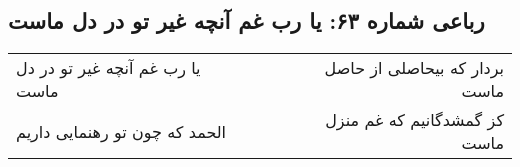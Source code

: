 \begin{center}
\section*{رباعی شماره ۶۳: یا رب غم آنچه غیر تو در دل ماست}
\label{sec:sh063}
\begin{longtable}{l p{0.5cm} r}
یا رب غم آنچه غیر تو در دل ماست
&&
بردار که بیحاصلی از حاصل ماست
\\
الحمد که چون تو رهنمایی داریم
&&
کز گمشدگانیم که غم منزل ماست
\\
\end{longtable}
\end{center}
